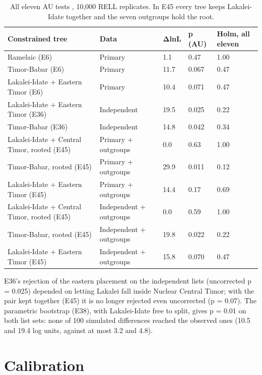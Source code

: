 \documentclass[11pt]{article}
\newcommand{\hd}[1]{\begin{minipage}[b]{\linewidth}\raggedright #1\end{minipage}}
\begin{document}
\begin{table}[tbp]
\caption{All eleven AU tests \citep{shimodaira2002}, 10,000 RELL
replicates. In E45 every tree keeps Lakalei-Idate together and the seven
outgroups hold the root.}
\label{tab:au}
\begin{tabularx}{\linewidth}{@{}L{2.35}L{1.3}L{0.4}L{0.45}L{0.5}@{}}
\toprule
\hd{Constrained tree} & \hd{Data} & \hd{ΔlnL} & \hd{p (AU)} & \hd{Holm, all eleven} \\
\midrule
Ramelaic (E6) & Primary & 1.1 & 0.47 & 1.00 \\
Timor-Babar (E6) & Primary & 11.7 & 0.067 & 0.47 \\
Lakalei-Idate + Eastern Timor (E6) & Primary & 10.4 & 0.071 & 0.47 \\
Lakalei-Idate + Eastern Timor (E36) & Independent & 19.5 & 0.025 & 0.22 \\
Timor-Babar (E36) & Independent & 14.8 & 0.042 & 0.34 \\
Lakalei-Idate + Central Timor, rooted (E45) & Primary + outgroups & 0.0 & 0.63 & 1.00 \\
Timor-Babar, rooted (E45) & Primary + outgroups & 29.9 & 0.011 & 0.12 \\
Lakalei-Idate + Eastern Timor (E45) & Primary + outgroups & 14.4 & 0.17 & 0.69 \\
Lakalei-Idate + Central Timor, rooted (E45) & Independent + outgroups & 0.0 & 0.59 & 1.00 \\
Timor-Babar, rooted (E45) & Independent + outgroups & 19.8 & 0.022 & 0.22 \\
Lakalei-Idate + Eastern Timor (E45) & Independent + outgroups & 15.8 & 0.070 & 0.47 \\
\bottomrule
\end{tabularx}
\end{table}

E36's rejection of the eastern placement on the independent lists (uncorrected p = 0.025) depended on letting Lakalei fall inside Nuclear Central Timor; with the pair kept together (E45) it is no longer rejected even uncorrected (p = 0.07). The parametric bootstrap (E38), with Lakalei-Idate free to split, gives p = 0.01 on both list sets: none of 100 simulated differences reached the observed ones (10.5 and 19.4 log units, against at most 3.2 and 4.8).

\section{Calibration}\label{sec:calibration}
\end{document}
